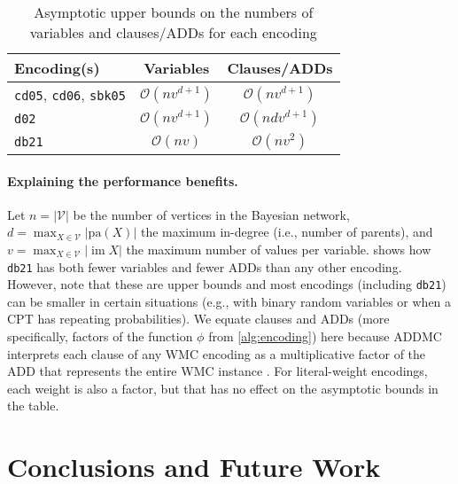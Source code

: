 \documentclass{article}
\theoremstyle{definition}
\theoremstyle{remark}
\DeclareMathOperator{\im}{im}
\begin{document}
{\begin{table}
  \centering
  \caption{Asymptotic upper bounds on the numbers of variables and clauses/ADDs
    for each encoding}
  \label{tbl:asymptotes}
  \begin{tabular}{lcc}
    \toprule
    Encoding(s) & Variables & Clauses/ADDs \\
    \midrule
    \texttt{cd05}, \texttt{cd06}, \texttt{sbk05} & $\mathcal{O}(nv^{d+1})$ & $\mathcal{O}(nv^{d+1})$ \\
    \texttt{d02} & $\mathcal{O}(nv^{d+1})$ & $\mathcal{O}(ndv^{d+1})$ \\
    \texttt{db21} & $\mathcal{O}(nv)$ & $\mathcal{O}(nv^2)$ \\
    \bottomrule
  \end{tabular}
\end{table}

\paragraph{Explaining the performance benefits.} Let $n = |\mathcal{V}|$ be the
number of vertices in the Bayesian network, $d = \max_{X \in \mathcal{V}}
|\mathrm{pa}(X)|$ the maximum in-degree (i.e., number of parents), and $v =
\max_{X \in \mathcal{V}} |\im X|$ the maximum number of values per variable.
 shows how \texttt{db21} has both fewer variables and fewer
ADDs than any other encoding. However, note that these are upper bounds and most
encodings (including \texttt{db21}) can be smaller in certain situations (e.g.,
with binary random variables or when a CPT has repeating probabilities). We
equate clauses and ADDs (more specifically, factors of the function $\phi$ from
\cref{alg:encoding}) here because ADDMC interprets each clause of any WMC
encoding as a multiplicative factor of the ADD that represents the entire WMC
instance \cite{DBLP:conf/aaai/DudekPV20}. For literal-weight encodings, each
weight is also a factor, but that has no effect on the asymptotic bounds in the
table.


\section{Conclusions and Future Work}

}
\end{document}
